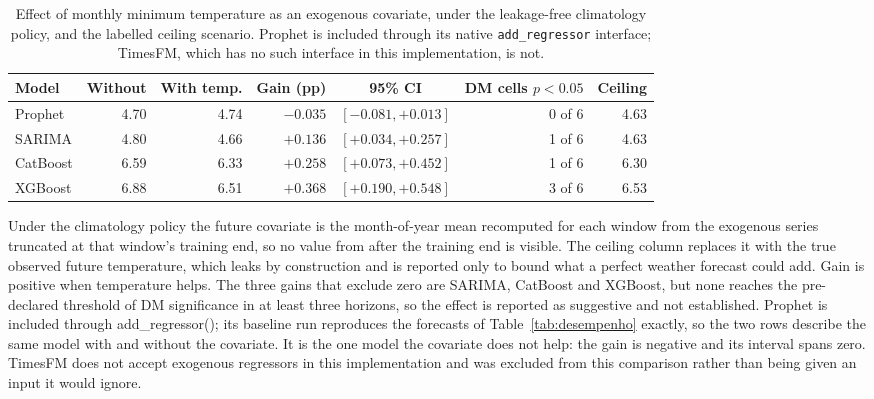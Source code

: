 \begin{table}[htbp]
\centering
\small
\setlength{\tabcolsep}{4pt}
\caption{Effect of monthly minimum temperature as an exogenous covariate, under the
leakage-free climatology policy, and the labelled ceiling scenario. Prophet is
included through its native \texttt{add\_regressor} interface; TimesFM, which has
no such interface in this implementation, is not.}
\label{tab:temperatura}
\begin{tabular}{lrrrcrr}
\toprule
Model & Without & With temp. & Gain (pp) & 95\% CI & DM cells $p<0.05$ & Ceiling \\
\midrule
Prophet & 4.70 & 4.74 & $-0.035$ & $[-0.081, +0.013]$ & 0 of 6 & 4.63 \\
SARIMA & 4.80 & 4.66 & $+0.136$ & $[+0.034, +0.257]$ & 1 of 6 & 4.63 \\
CatBoost & 6.59 & 6.33 & $+0.258$ & $[+0.073, +0.452]$ & 1 of 6 & 6.30 \\
XGBoost & 6.88 & 6.51 & $+0.368$ & $[+0.190, +0.548]$ & 3 of 6 & 6.53 \\
\bottomrule
\end{tabular}

\vspace{0.5em}
\begin{minipage}{\textwidth}
\footnotesize
Under the climatology policy the future covariate is the month-of-year mean recomputed
for each window from the exogenous series truncated at that window's training end, so no
value from after the training end is visible. The ceiling column replaces it with the
true observed future temperature, which leaks by construction and is reported only to
bound what a perfect weather forecast could add. Gain is positive when temperature helps.
The three gains that exclude zero are SARIMA, CatBoost and XGBoost, but none reaches the
pre-declared threshold of DM significance in at least three horizons, so the effect is
reported as suggestive and not established. Prophet is included through add\_regressor(); its baseline run reproduces the forecasts of Table~\ref{tab:desempenho} exactly, so the two rows describe the same model with and without the covariate. It is the one model the covariate does not help: the gain is negative and its interval spans zero.
TimesFM does not accept exogenous regressors in this implementation and was excluded from
this comparison rather than being given an input it would ignore.
\end{minipage}
\end{table}
